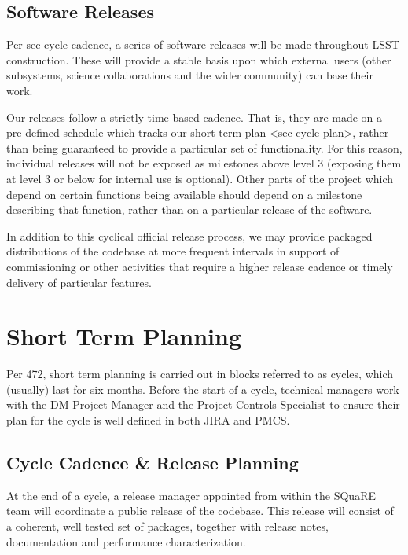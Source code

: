 \subsection{Software Releases}\label{software-releases}

Per sec-cycle-cadence, a series of software releases will be made
throughout LSST construction. These will provide a stable basis upon
which external users (other subsystems, science collaborations and the
wider community) can base their work.

Our releases follow a strictly time-based cadence. That is, they are
made on a pre-defined schedule which tracks our
short-term plan \textless{}sec-cycle-plan\textgreater{}, rather than
being guaranteed to provide a particular set of functionality. For this
reason, individual releases will not be exposed as milestones above
level 3 (exposing them at level 3 or below for internal use is
optional). Other parts of the project which depend on certain functions
being available should depend on a milestone describing that function,
rather than on a particular release of the software.

In addition to this cyclical official release process, we may provide
packaged distributions of the codebase at more frequent intervals in
support of commissioning or other activities that require a higher
release cadence or timely delivery of particular features.

\section{Short Term Planning}\label{short-term-planning}

Per 472, short term planning is carried out in blocks referred to as
cycles, which (usually) last for six months. Before the start of a
cycle, technical managers work with the DM Project Manager and the
Project Controls Specialist to ensure their plan for the cycle is well
defined in both JIRA and PMCS.

\subsection{Cycle Cadence \& Release
Planning}\label{cycle-cadence-release-planning}

At the end of a cycle, a release manager appointed from within the
SQuaRE team will coordinate a public release of the codebase. This
release will consist of a coherent, well tested set of packages,
together with release notes, documentation and performance
characterization.

